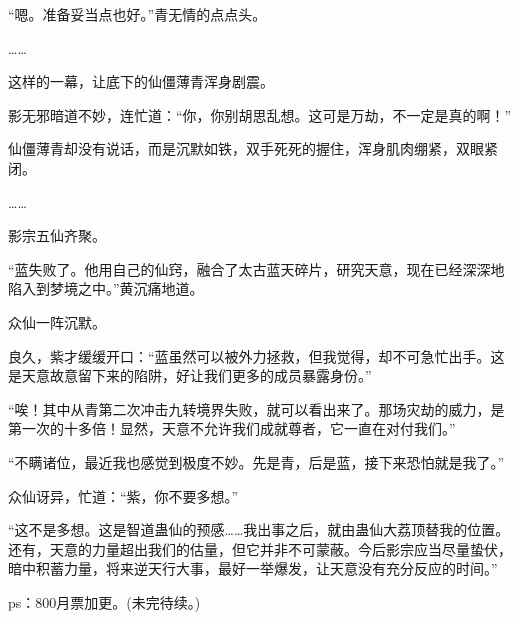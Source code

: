 \begin{this_body}
“嗯。准备妥当点也好。”青无情的点点头。

……

这样的一幕，让底下的仙僵薄青浑身剧震。

影无邪暗道不妙，连忙道：“你，你别胡思乱想。这可是万劫，不一定是真的啊！”

仙僵薄青却没有说话，而是沉默如铁，双手死死的握住，浑身肌肉绷紧，双眼紧闭。

……

影宗五仙齐聚。

“蓝失败了。他用自己的仙窍，融合了太古蓝天碎片，研究天意，现在已经深深地陷入到梦境之中。”黄沉痛地道。

众仙一阵沉默。

良久，紫才缓缓开口：“蓝虽然可以被外力拯救，但我觉得，却不可急忙出手。这是天意故意留下来的陷阱，好让我们更多的成员暴露身份。”

“唉！其中从青第二次冲击九转境界失败，就可以看出来了。那场灾劫的威力，是第一次的十多倍！显然，天意不允许我们成就尊者，它一直在对付我们。”

“不瞒诸位，最近我也感觉到极度不妙。先是青，后是蓝，接下来恐怕就是我了。”

众仙讶异，忙道：“紫，你不要多想。”

“这不是多想。这是智道蛊仙的预感……我出事之后，就由蛊仙大荔顶替我的位置。还有，天意的力量超出我们的估量，但它并非不可蒙蔽。今后影宗应当尽量蛰伏，暗中积蓄力量，将来逆天行大事，最好一举爆发，让天意没有充分反应的时间。”

ps：800月票加更。(未完待续。)

\end{this_body}

